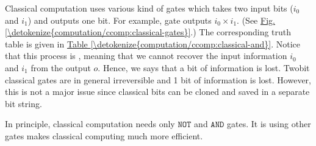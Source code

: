 \documentclass[letterpaper,10pt,english]{jupyterBook}
\begin{document}
\sphinxAtStartPar
Classical computation uses various kind of gates which takes two input bits (\(i_0\) and \(i_1\)) and outputs one bit.  For example,  gate outputs \(i_0 \times i_1\).  (See \hyperref[\detokenize{computation/ccomp:classical-gates}]{Fig.\@ \ref{\detokenize{computation/ccomp:classical-gates}}}.)
The corresponding truth table is given in \hyperref[\detokenize{computation/ccomp:classical-and}]{Table \ref{\detokenize{computation/ccomp:classical-and}}}.  Notice that this process is , meaning that we cannot recover the input information \(i_0\) and \(i_1\) from the output \(o\).  Hence, we says that a bit of information is lost.  Two\sphinxhyphen{}bit classical gates  are in general irreversible and 1 bit of information is lost.  However, this is not a major issue since classical bits can be cloned and saved in a separate bit string.

\sphinxAtStartPar
In principle, classical computation needs only \(\texttt{NOT}\) and \(\texttt{AND}\) gates.  It is using other gates makes classical computing much more efficient.
\end{document}
